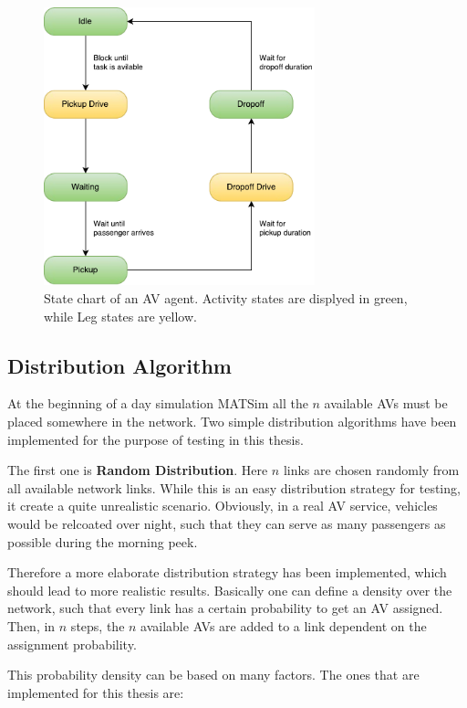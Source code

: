 \begin{figure}
    \centering
    \includegraphics[width=0.7\textwidth]{figures/avstates.pdf}
    \caption{State chart of an AV agent. Activity states are displyed in green, while Leg states are yellow.}
    \label{fig:avstates}
\end{figure}

\subsection{Distribution Algorithm}

At the beginning of a day simulation MATSim all the $n$ available AVs must be placed
somewhere in the network. Two simple distribution algorithms have been implemented
for the purpose of testing in this thesis.

The first one is \textbf{Random Distribution}. Here $n$ links are chosen randomly
from all available network links. While this is an easy distribution strategy for testing,
it create a quite unrealistic scenario. Obviously, in a real AV service, vehicles
would be relcoated over night, such that they can serve as many passengers as
possible during the morning peek.

Therefore a more elaborate distribution strategy has been implemented, which should
lead to more realistic results. Basically one can define a density over the network,
such that every link has a certain probability to get an AV assigned. Then, in $n$
steps, the $n$ available AVs are added to a link dependent on the assignment
probability.

This probability density can be based on many factors. The ones that are implemented
for this thesis are:

